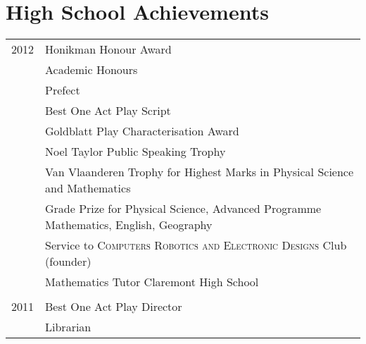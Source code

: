 \section{High School Achievements}
\begin{tabular}{R{2.5cm}|l}
2012 & Honikman Honour Award\\
& Academic Honours\\
& Prefect\\
& Best One Act Play Script\\
& Goldblatt Play Characterisation Award\\
& Noel Taylor Public Speaking Trophy\\
& Van Vlaanderen Trophy for Highest Marks in Physical Science and Mathematics\\
& Grade Prize for Physical Science, Advanced Programme Mathematics, English, Geography\\
& Service to \textsc{Computers Robotics and Electronic Designs} Club (founder)\\
& Mathematics Tutor Claremont High School\\
&\\
2011& Best One Act Play Director\\
& Librarian\\

\end{tabular}

